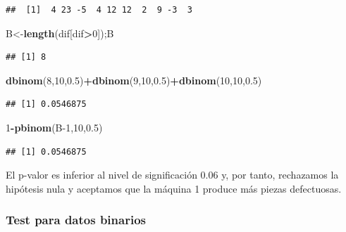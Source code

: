 \documentclass[
]{article}
\newenvironment{Shaded}{\begin{snugshade}}{\end{snugshade}}
\newcommand{\DecValTok}[1]{\textcolor[rgb]{0.00,0.00,0.81}{#1}}
\newcommand{\FloatTok}[1]{\textcolor[rgb]{0.00,0.00,0.81}{#1}}
\newcommand{\FunctionTok}[1]{\textcolor[rgb]{0.13,0.29,0.53}{\textbf{#1}}}
\newcommand{\NormalTok}[1]{#1}
\newcommand{\OtherTok}[1]{\textcolor[rgb]{0.56,0.35,0.01}{#1}}
\newcommand{\SpecialCharTok}[1]{\textcolor[rgb]{0.81,0.36,0.00}{\textbf{#1}}}
\begin{document}
\begin{verbatim}
##  [1]  4 23 -5  4 12 12  2  9 -3  3
\end{verbatim}

\begin{Shaded}
\begin{Highlighting}[]
\NormalTok{B}\OtherTok{\textless{}{-}}\FunctionTok{length}\NormalTok{(dif[dif}\SpecialCharTok{\textgreater{}}\DecValTok{0}\NormalTok{]);B}
\end{Highlighting}
\end{Shaded}

\begin{verbatim}
## [1] 8
\end{verbatim}

\begin{Shaded}
\begin{Highlighting}[]
\FunctionTok{dbinom}\NormalTok{(}\DecValTok{8}\NormalTok{,}\DecValTok{10}\NormalTok{,}\FloatTok{0.5}\NormalTok{)}\SpecialCharTok{+}\FunctionTok{dbinom}\NormalTok{(}\DecValTok{9}\NormalTok{,}\DecValTok{10}\NormalTok{,}\FloatTok{0.5}\NormalTok{)}\SpecialCharTok{+}\FunctionTok{dbinom}\NormalTok{(}\DecValTok{10}\NormalTok{,}\DecValTok{10}\NormalTok{,}\FloatTok{0.5}\NormalTok{)}
\end{Highlighting}
\end{Shaded}

\begin{verbatim}
## [1] 0.0546875
\end{verbatim}

\begin{Shaded}
\begin{Highlighting}[]
\DecValTok{1}\SpecialCharTok{{-}}\FunctionTok{pbinom}\NormalTok{(B}\DecValTok{{-}1}\NormalTok{,}\DecValTok{10}\NormalTok{,}\FloatTok{0.5}\NormalTok{)}
\end{Highlighting}
\end{Shaded}

\begin{verbatim}
## [1] 0.0546875
\end{verbatim}

El p-valor es inferior al nivel de significación 0.06 y, por tanto, rechazamos la hipótesis nula y aceptamos que la máquina 1 produce más piezas defectuosas.

\subsubsection{Test para datos binarios}\label{test-para-datos-binarios}
\end{document}
